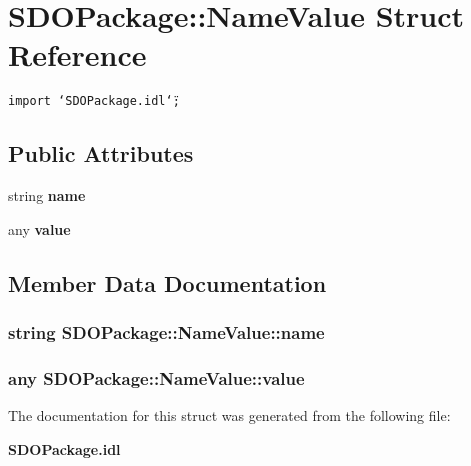 \section{SDOPackage::Name\-Value Struct Reference}
\label{structSDOPackage_1_1NameValue}
{\tt import \char`\"{}SDOPackage.idl\char`\"{};}

\subsection*{Public Attributes}
\begin{CompactItemize}
\item 
string {\bf name}
\item 
any {\bf value}
\end{CompactItemize}


\subsection{Member Data Documentation}
\subsubsection{\setlength{\rightskip}{0pt plus 5cm}string {\bf SDOPackage::Name\-Value::name}}\label{structSDOPackage_1_1NameValue_SDOPackage_1_1NameValueo0}


\subsubsection{\setlength{\rightskip}{0pt plus 5cm}any {\bf SDOPackage::Name\-Value::value}}\label{structSDOPackage_1_1NameValue_SDOPackage_1_1NameValueo1}




The documentation for this struct was generated from the following file:\begin{CompactItemize}
\item 
{\bf SDOPackage.idl}\end{CompactItemize}
